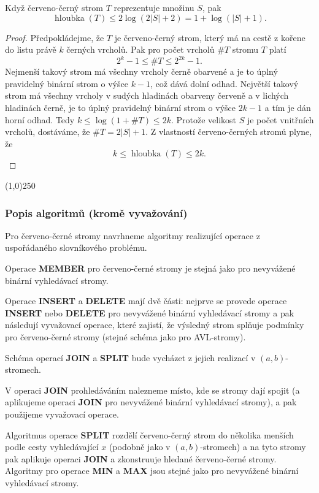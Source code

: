 \documentclass[a4paper,12pt]{article}
\newenvironment{myproof}{
  \begin{proof}
    
  }{
  \end{proof}
  \begin{center}
   \line(1,0){250}
   \end{center}
  }
\DeclareMathOperator*{\hloubka}{hloubka}
\begin{document}
\begin{veta}Když červeno-černý strom $T$ 
reprezentuje množinu $S$, pak $$\hloubka(T)\le 2\log(2|S|+2)=1+\log(|S|+1).$$
\end{veta}
\begin{myproof}

Předpokládejme, že $T$ je červeno-černý strom, který má 
na cestě z kořene do listu právě $k$ černých 
vrcholů. Pak pro počet vrcholů $\#T$ 
stromu $T$ platí 
$$2^k-1\le \#T\le 2^{2k}-1.$$
Nejmenší takový strom má všechny vrcholy černě 
obarvené a je to úplný pravidelný binární strom o 
výšce $k-1$, což dává dolní odhad.  Největší takový 
strom má všechny vrcholy v sudých hladinách obarveny 
červeně a v lichých hladinách černě, je to úplný 
pravidelný binární strom o výšce $2k-1$ a tím je dán 
horní odhad. Tedy $k\le\log(1+\#T)\le 2k$.
Protože velikost $S$ je počet vnitřních vrcholů, 
dostáváme, že $\#T=2|S|+1$. Z vlastností červeno-černých 
stromů plyne, že 
$$k\le\hloubka(T)\le 2k.$$

\end{myproof}


\subsubsection{Popis algoritmů (kromě vyvažování)}

Pro červeno-černé stromy navrhneme algoritmy 
realizující ope\-race z uspořádaného slovní\-ko\-vého problému.  

Operace {\bf MEMBER} pro červeno-černé stromy je stejná jako pro 
nevyvážené binární vyhledávací stromy. 

Operace 
{\bf IN\-SERT} a {\bf DELETE} mají dvě části:  nejprve se provede 
ope\-race {\bf INSERT} nebo {\bf DELETE} pro nevyvážené binární 
vy\-hledávací stromy a pak následují vyvažovací operace, které 
zajistí, že výsledný strom splňuje pod\-mín\-ky pro červeno-černé 
stromy (stejné schéma jako pro AVL-stromy). 

Schéma operací 
{\bf JOIN} a {\bf SPLIT} bude vycházet z jejich realizací v $
(a,b)$-stromech. 

V operaci {\bf JOIN} prohledáváním nalezneme místo, kde se 
stromy  
dají spojit (a aplikujeme operaci {\bf JOIN} pro 
nevyvážené 
binární vyhledá\-va\-cí stromy), a pak použijeme 
vyvažovací operace. 

Algoritmus ope\-race {\bf SPLIT} rozdělí červeno-černý strom 
do několika menších podle cesty vyhledávající $
x$ (podobně jako 
v $(a,b)$-stromech) a na tyto stromy pak aplikuje operaci {\bf JOIN }
a zkonstruuje hledané červeno-černé stromy. Algoritmy pro 
ope\-race {\bf MIN} a {\bf MAX} jsou stejné jako pro nevyvážené binární 
vyhledávací stromy.
\end{document}
